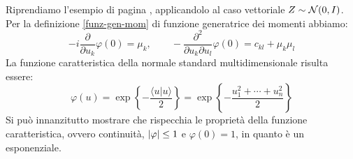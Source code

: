 \begin{ese}
  Riprendiamo l'esempio di pagina \pageref{caratt-normale}, applicandolo al caso vettoriale $Z \sim \mathcal N(0, I)$.
  Per la definizione \ref{funz-gen-mom} di funzione generatrice dei momenti abbiamo:
  $$-i\frac{\partial}{\partial u_k} \varphi  (0) = \mu_k,\qquad -\frac{\partial^2}{\partial u_k \partial u_l} \varphi(0) = c_{kl} + \mu_k \mu_l$$
  La funzione caratteristica della normale standard multidimensionale risulta essere:
  $$\varphi(u)=\exp \left\{-\frac{\langle u | u \rangle}{2}\right\} = \exp \left\{-\frac{u_1^2 + \cdots + u_n^2}{2}\right\}$$
  Si può innanzitutto mostrare che rispecchia le proprietà della funzione caratteristica, ovvero continuità, $\lvert\varphi\rvert \leq 1$ e $\varphi(0) = 1$, in quanto è un esponenziale.


\end{ese}
